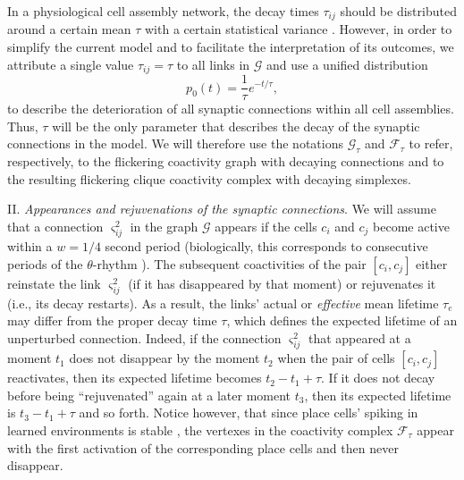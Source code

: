 \documentclass[12pt,tightenlines]{revtex4}
\begin{document}
In a physiological cell assembly network, the decay times $\tau_{ij}$ should be distributed around a certain mean 
$\tau$ with a certain statistical variance \cite{ Sayer}. However, in order to simplify the current model and to facilitate 
the interpretation of its outcomes, we attribute a single value $\tau_{ij} = \tau$ to all links in $\mathcal{G}$ and use a 
unified distribution
\begin{equation}
p_0(t) = \frac{1}{\tau}e^{-t/\tau},
\label{decay}
\end{equation}
to describe the deterioration of all synaptic connections within all cell assemblies. Thus, $\tau$ will be the only parameter 
that describes the decay of the synaptic connections in the model. We will therefore use the notations $\mathcal{G}_{\tau}$ 
and $\mathcal{F}_{\tau}$ to refer, respectively, to the flickering coactivity graph with decaying connections and to the resulting 
flickering clique coactivity complex with decaying simplexes. 

II. \emph{Appearances and rejuvenations of the synaptic connections}. We will assume that a connection $\varsigma^2_{ij}$ 
in the graph $\mathcal{G}$ appears if the cells $c_i$ and $c_j$ become active within a $w = 1/4$ second period (biologically, 
this corresponds to consecutive periods of the $\theta$-rhythm \cite{Mizuseki,Arai}). The subsequent coactivities of the pair 
$[c_i, c_j]$ either reinstate the link $\varsigma^2_{ij}$ (if it has disappeared by that moment) or rejuvenates it (i.e., its decay 
restarts). 
As a result, the links' actual or \emph{effective} mean lifetime $\tau_{e}$ may differ from the proper decay time $\tau$, which 
defines the expected lifetime of an unperturbed connection. Indeed, if the connection $\varsigma^2_{ij}$ that appeared at a 
moment $t_1$ does not disappear by the moment $t_2$ when the pair of cells $[c_i, c_j]$ reactivates, then its expected lifetime 
becomes $t_2 - t_1 + \tau$. If it does not decay before being ``rejuvenated'' again at a later moment $t_3$, then its expected 
lifetime is $t_3 - t_1 + \tau$ and so forth. Notice however, that since place cells' spiking in learned environments is stable 
\cite{Thompson}, the vertexes in the coactivity complex $\mathcal{F}_{\tau}$ appear with the first activation of the corresponding 
place cells and then never disappear. 
\end{document}
